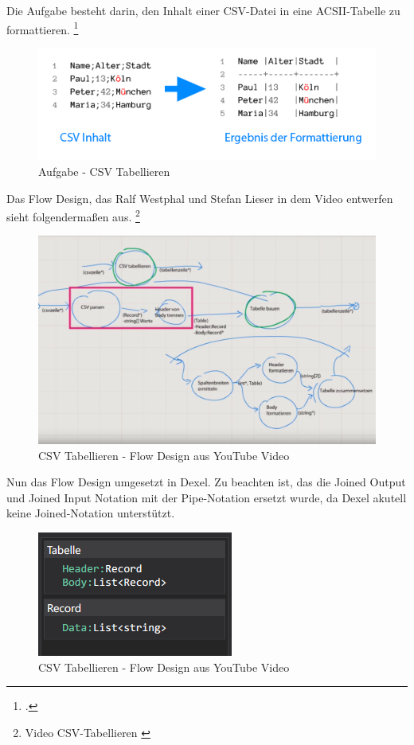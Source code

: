 Die Aufgabe besteht darin, den Inhalt einer CSV-Datei in eine ACSII-Tabelle zu formattieren.
\footcite[S.12]{kata}
\begin{figure}[H]
	\centering
	\includegraphics[width=0.8\linewidth]{./img/csvAufgabe.png}
	\caption{Aufgabe - CSV Tabellieren}
\end{figure}


Das Flow Design, das Ralf Westphal und Stefan Lieser in dem Video entwerfen sieht folgendermaßen aus. \footnote{Video CSV-Tabellieren \cite{youtubevideos}}


\begin{figure}[H]
	\centering
	\includegraphics[width=1\linewidth]{./img/youtubeflowdesign.png}
	\caption{CSV Tabellieren - Flow Design aus YouTube Video}
\end{figure}


Nun das Flow Design umgesetzt in Dexel. Zu beachten ist, das die Joined Output und Joined Input Notation mit der Pipe-Notation ersetzt wurde, da Dexel akutell keine Joined-Notation unterstützt.


\begin{figure}[H]
	\centering
	\includegraphics[width=0.4\linewidth]{./img/csvtabellierenDexelDataTypes.png}
	\caption{CSV Tabellieren - Flow Design aus YouTube Video}
\end{figure}




